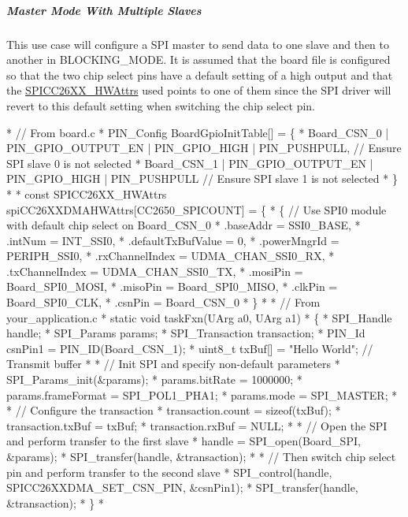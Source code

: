\subparagraph*{Master Mode With Multiple Slaves\label{_s_p_i_c_c26_x_x_d_m_a_8h_USE_CASE_MMMS}%
\hypertarget{_s_p_i_c_c26_x_x_d_m_a_8h_USE_CASE_MMMS}{}%
}

This use case will configure a S\-P\-I master to send data to one slave and then to another in B\-L\-O\-C\-K\-I\-N\-G\-\_\-\-M\-O\-D\-E. It is assumed that the board file is configured so that the two chip select pins have a default setting of a high output and that the \hyperlink{struct_s_p_i_c_c26_x_x___h_w_attrs}{S\-P\-I\-C\-C26\-X\-X\-\_\-\-H\-W\-Attrs} used points to one of them since the S\-P\-I driver will revert to this default setting when switching the chip select pin.


\begin{DoxyCode}
*  \textcolor{comment}{// From board.c}
*  PIN_Config BoardGpioInitTable[] = \{
*      Board\_CSN\_0   | PIN_GPIO_OUTPUT_EN | PIN_GPIO_HIGH   | PIN_PUSHPULL,   \textcolor{comment}{// Ensure SPI slave 0 is not
       selected}
*      Board\_CSN\_1   | PIN_GPIO_OUTPUT_EN | PIN_GPIO_HIGH   | PIN_PUSHPULL    \textcolor{comment}{// Ensure SPI slave 1 is not
       selected}
*  \}
*
*  \textcolor{keyword}{const} SPICC26XX_HWAttrs spiCC26XXDMAHWAttrs[CC2650\_SPICOUNT] = \{
*  \{   \textcolor{comment}{// Use SPI0 module with default chip select on Board\_CSN\_0}
*      .baseAddr = SSI0\_BASE,
*      .intNum = INT\_SSI0,
*      .defaultTxBufValue = 0,
*      .powerMngrId = PERIPH\_SSI0,
*      .rxChannelIndex = UDMA\_CHAN\_SSI0\_RX,
*      .txChannelIndex = UDMA\_CHAN\_SSI0\_TX,
*      .mosiPin = Board\_SPI0\_MOSI,
*      .misoPin = Board\_SPI0\_MISO,
*      .clkPin = Board\_SPI0\_CLK,
*      .csnPin = Board\_CSN\_0
*  \}
*
*  \textcolor{comment}{// From your\_application.c}
*  \textcolor{keyword}{static} \textcolor{keywordtype}{void} taskFxn(UArg a0, UArg a1)
*  \{
*      SPI_Handle handle;
*      SPI_Params params;
*      SPI_Transaction transaction;
*      PIN_Id csnPin1  = PIN_ID(Board\_CSN\_1);
*      uint8\_t txBuf[] = \textcolor{stringliteral}{"Hello World"};    \textcolor{comment}{// Transmit buffer}
*
*      \textcolor{comment}{// Init SPI and specify non-default parameters}
*      SPI_Params_init(&params);
*      params.bitRate     = 1000000;
*      params.frameFormat = SPI_POL1_PHA1;
*      params.mode        = SPI_MASTER;
*
*      \textcolor{comment}{// Configure the transaction}
*      transaction.count = \textcolor{keyword}{sizeof}(txBuf);
*      transaction.txBuf = txBuf;
*      transaction.rxBuf = NULL;
*
*      \textcolor{comment}{// Open the SPI and perform transfer to the first slave}
*      handle = SPI_open(Board\_SPI, &params);
*      SPI_transfer(handle, &transaction);
*
*      \textcolor{comment}{// Then switch chip select pin and perform transfer to the second slave}
*      SPI_control(handle, SPICC26XXDMA_SET_CSN_PIN, &csnPin1);
*      SPI_transfer(handle, &transaction);
*  \}
*  
\end{DoxyCode}


